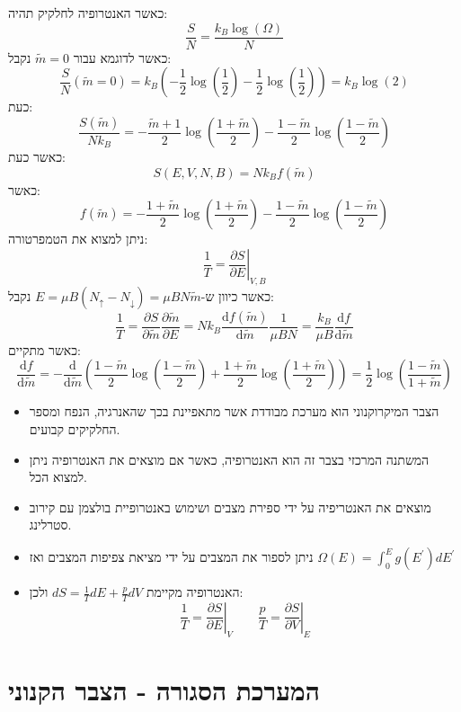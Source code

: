 \documentclass{tstextbook}
\begin{document}
\begin{example}
כאשר האנטרופיה לחלקיק תהיה:
$$\frac{S}{N}=\frac{k_{B}\log\left( \Omega \right)}{N}$$
כאשר לדוגמא עבור \(\tilde{m}=0\) נקבל:
$$\frac{S}{N}\left( \tilde{m} = 0 \right)=k_{B}\left( -\frac{1}{2}\log\left( \frac{1}{2} \right)-\frac{1}{2}\log\left( \frac{1}{2} \right) \right)=k_{B}\log(2)$$
כעת:
$$\frac{S\left( \tilde{m} \right)}{Nk_{B}}=-\frac{\tilde{m}+1}{2}\log\left( \frac{1+\tilde{m}}{2} \right)- \frac{1-\tilde{m}}{2}\log\left( \frac{1-\tilde{m}}{2} \right)$$
כאשר כעת:
$$S(E,V,N,B)=N k_{B} f\left( \tilde{m} \right)$$
כאשר:
$$f\left( \tilde{m} \right)= - \frac{1+\tilde{m}}{2}\log\left( \frac{1+\tilde{m}}{2} \right)-\frac{1-\tilde{m}}{2}\log\left( \frac{1-\tilde{m}}{2} \right)$$
ניתן למצוא את הטמפרטורה:
$$\frac{1}{T}=\left.\frac{\partial S}{\partial E}\right|_{V,B} $$
כאשר כיוון ש-\(E=\mu B\left( N_{\uparrow}-N_{\downarrow} \right)=\mu BN\tilde{m}\) נקבל:
$$\frac{1}{T} = \frac{\partial  S}{\partial \tilde{m}} \frac{\partial \tilde{m}}{\partial E} = Nk_{B}\frac{\mathrm{d} f\left( \tilde{m} \right)}{\mathrm{d} \tilde{m}}  \frac{1}{\mu B N}=\frac{k_{B}}{\mu B}\frac{\mathrm{d} f}{\mathrm{d} \tilde{m}} $$
כאשר מתקיים:
$$\frac{\mathrm{d} f}{\mathrm{d} \tilde{m}} =-\frac{\mathrm{d} }{\mathrm{d} \tilde{m}} \left(\frac{ 1-\tilde{m}}{2}\log\left( \frac{1-\tilde{m}}{2} \right)+\frac{1+\tilde{m}}{2}\log\left( \frac{1+\tilde{m}}{2} \right) \right)=\frac{1}{2}\log\left( \frac{1-\tilde{m} }{1+\tilde{m}}\right)$$

\end{example}
\begin{summary}
  \begin{itemize}
    \item הצבר המיקרוקנוני הוא מערכת מבודדת אשר מתאפיינת בכך שהאנרגיה, הנפח ומספר החלקיקים קבועים.
    \item המשתנה המרכזי בצבר זה הוא האנטרופיה, כאשר אם מוצאים את האנטרופיה ניתן למצוא הכל.
    \item מוצאים את האנטריפיה על ידי ספירת מצבים ושימוש באנטרופיית בולצמן עם קירוב סטרלינג.
    \item ניתן לספור את המצבים על ידי מציאת צפיפות המצבים ואז \({\Omega}(E)=\int_{0}^{E}g(E^{\prime})d E^{\prime}\)
    \item האנטרופיה מקיימת \(dS= \frac{1}{T}dE+\frac{p}{T}dV\) ולכן:
$$\frac{1}{T}=\left. \frac{\partial S}{\partial E} \right \rvert_{V} \qquad \frac{p}{T}=\left. \frac{\partial S}{\partial V} \right \rvert_{E}$$
  \end{itemize}
\end{summary}
\section{המערכת הסגורה - הצבר הקנוני}
\end{document}
